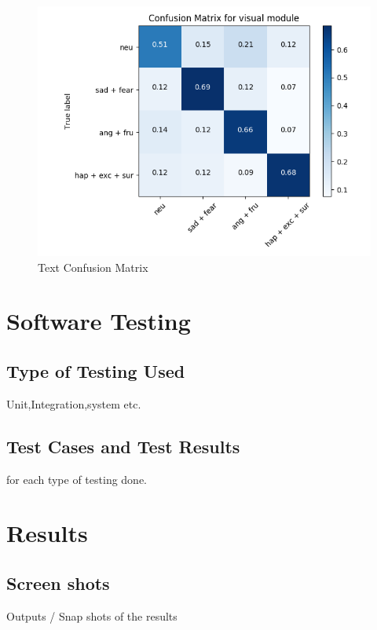 \documentclass[oneside,a4paper,12pt]{report}
\begin{document}
\begin{normalsize}
\begin{itemize}
\begin{itemize}
		
		\begin{center}
			\begin{figure}[!htbp]
				\centering
				\includegraphics[width=\textwidth]{text-confusion-matrix.png}
				\caption{Text Confusion Matrix}
				\label{fig:text-confusion-matrix}
			\end{figure}
		\end{center} 
		
		
	\end{itemize}
\end{itemize}


  
  
\chapter{Software Testing}
 \section{Type of Testing Used}
   Unit,Integration,system etc.
   \section{Test Cases and Test Results}
   for each type of testing done.    
   
\chapter{Results}
\section{Screen shots}
Outputs / Snap shots of the results

\end{normalsize}
\end{document}
